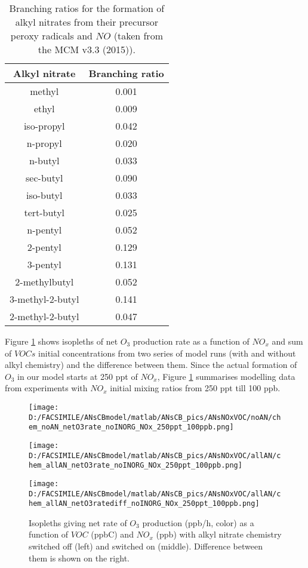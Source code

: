 \documentclass[11pt,a4paper]{article}
\begin{document}
\begin{table} %
\caption{Branching ratios for the formation of alkyl nitrates from their precursor peroxy radicals and $NO$ (taken from the MCM v3.3 (2015)).}\label{tab:ANbranching}
\centering
\begin{tabular}{cc}
\hline
Alkyl nitrate    & Branching ratio \\
\hline
methyl           & 0.001 \\
ethyl            & 0.009 \\
iso-propyl       & 0.042 \\
n-propyl         & 0.020 \\
n-butyl          & 0.033 \\
sec-butyl        & 0.090 \\
iso-butyl        & 0.033 \\ 
tert-butyl       & 0.025 \\
n-pentyl         & 0.052 \\
2-pentyl         & 0.129 \\
3-pentyl         & 0.131 \\
2-methylbutyl    & 0.052 \\
3-methyl-2-butyl & 0.141 \\
2-methyl-2-butyl & 0.047 \\
\hline
\end{tabular}
\end{table}

Figure \ref{fig:netO3rate_noAN_withAN_diff} shows isopleths of net $O_3$ production rate as a function of $NO_x$ and sum of $VOCs$ initial concentrations from two series of model runs (with and without alkyl chemistry) and the difference between them. Since the actual formation of $O_3$ in our model starts at 250 ppt of $NO_x$, Figure \ref{fig:netO3rate_noAN_withAN_diff} summarises modelling data from experiments with $NO_x$ initial mixing ratios from 250 ppt till 100 ppb.

\begin{figure} %
\centering
\begin{minipage}{.3\textwidth}
  \centering
  \texttt{[image: D:/FACSIMILE/ANsCBmodel/matlab/ANsCB\_pics/ANsNOxVOC/noAN/chem\_noAN\_netO3rate\_noINORG\_NOx\_250ppt\_100ppb.png]}
\end{minipage}
\begin{minipage}{.3\textwidth}
  \centering
  \texttt{[image: D:/FACSIMILE/ANsCBmodel/matlab/ANsCB\_pics/ANsNOxVOC/allAN/chem\_allAN\_netO3rate\_noINORG\_NOx\_250ppt\_100ppb.png]}
\end{minipage}
\begin{minipage}{.3\textwidth}
  \centering
  \texttt{[image: D:/FACSIMILE/ANsCBmodel/matlab/ANsCB\_pics/ANsNOxVOC/allAN/chem\_allAN\_netO3ratediff\_noINORG\_NOx\_250ppt\_100ppb.png]}
\end{minipage}
\caption{Isopleths giving net rate of $O_3$ production (ppb/h, color) as a function of $VOC$ (ppbC) and $NO_x$ (ppb) with alkyl nitrate chemistry switched off (left) and switched on (middle). Difference between them is shown on the right.}\label{fig:netO3rate_noAN_withAN_diff}
\end{figure}
\end{document}
